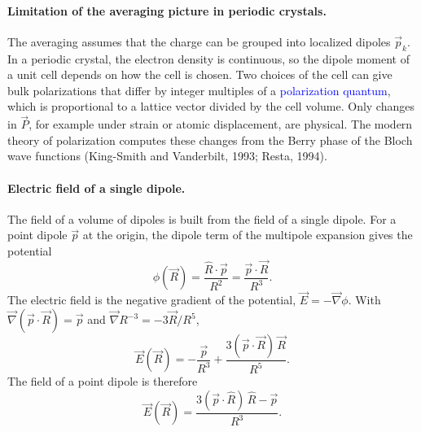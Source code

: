 \paragraph{Limitation of the averaging picture in periodic crystals.}
The averaging assumes that the charge can be grouped into localized dipoles $\vec p_k$. In a periodic crystal, the electron density is continuous, so the dipole moment of a unit cell depends on how the cell is chosen. Two choices of the cell can give bulk polarizations that differ by integer multiples of a \textcolor{blue}{polarization quantum}, which is proportional to a lattice vector divided by the cell volume. Only changes in $\vec P$, for example under strain or atomic displacement, are physical. The modern theory of polarization computes these changes from the Berry phase of the Bloch wave functions (King-Smith and Vanderbilt, 1993; Resta, 1994).

\paragraph{Electric field of a single dipole.}
The field of a volume of dipoles is built from the field of a single dipole. For a point dipole $\vec p$ at the origin, the dipole term of the multipole expansion gives the potential
\begin{equation*}
    \phi(\vec R) = \frac{\hat R\cdot\vec p}{R^2} = \frac{\vec p\cdot\vec R}{R^3}.
\end{equation*}
The electric field is the negative gradient of the potential, $\vec E = -\vec\nabla\phi$. With $\vec\nabla(\vec p\cdot\vec R) = \vec p$ and $\vec\nabla R^{-3} = -3\vec R/R^5$,
\begin{equation*}
    \vec E(\vec R) = -\frac{\vec p}{R^3} + \frac{3(\vec p\cdot\vec R)\,\vec R}{R^5}.
\end{equation*}
The field of a point dipole is therefore
\begin{equation}
    \boxed{
    \vec E(\vec R) = \frac{3(\vec p\cdot\hat R)\,\hat R - \vec p}{R^3}.
    }
\end{equation}

